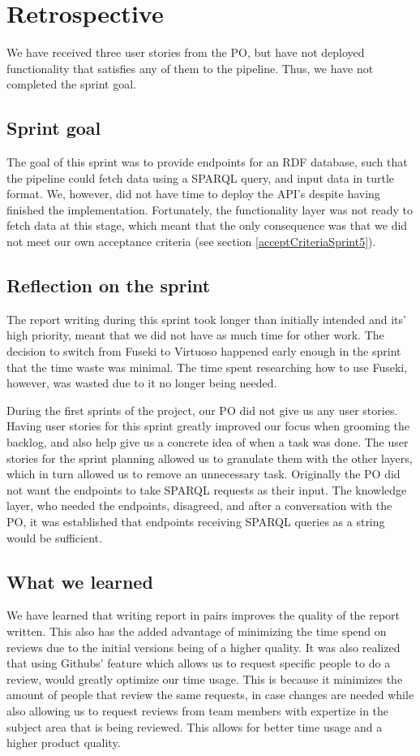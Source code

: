 \section{Retrospective}
We have received three user stories from the PO, but have not deployed functionality that satisfies any of them to the \knox{} pipeline. Thus, we have not completed the sprint goal.

\subsection{Sprint goal}
The goal of this sprint was to provide endpoints for an RDF database, such that the \knox{} pipeline could fetch data using a SPARQL query, and input data in turtle format. We, however, did not have time to deploy the API's despite having finished the implementation. Fortunately, the functionality layer was not ready to fetch data at this stage, which meant that the only consequence was that we did not meet our own acceptance criteria (see section \ref{acceptCriteriaSprint5}).

\subsection{Reflection on the sprint}
The report writing during this sprint took longer than initially intended and its' high priority, meant that we did not have as much time for other work.
The decision to switch from Fuseki to Virtuoso happened early enough in the sprint that the time waste was minimal. The time spent researching how to use Fuseki, however, was wasted due to it no longer being needed.

During the first sprints of the project, our PO did not give us any user stories. Having user stories for this sprint greatly improved our focus when grooming the backlog, and also help give us a concrete idea of when a task was done. 
The user stories for the sprint planning allowed us to granulate them with the other layers, which in turn allowed us to remove an unnecessary task. Originally the PO did not want the endpoints to take SPARQL requests as their input.
The knowledge layer, who needed the endpoints, disagreed, and after a conversation with the PO, it was established that endpoints receiving SPARQL queries as a string would be sufficient.

\subsection{What we learned}
We have learned that writing report in pairs improves the quality of the report written. This also has the added advantage of minimizing the time spend on reviews due to the initial versions being of a higher quality.
It was also realized that using Githubs' feature which allows us to request specific people to do a review, would greatly optimize our time usage. This is because it minimizes the amount of people that review the same requests, in case changes are needed while also allowing us to request reviews from team members with expertize in the subject area that is being reviewed. This allows for better time usage and a higher product quality. 

